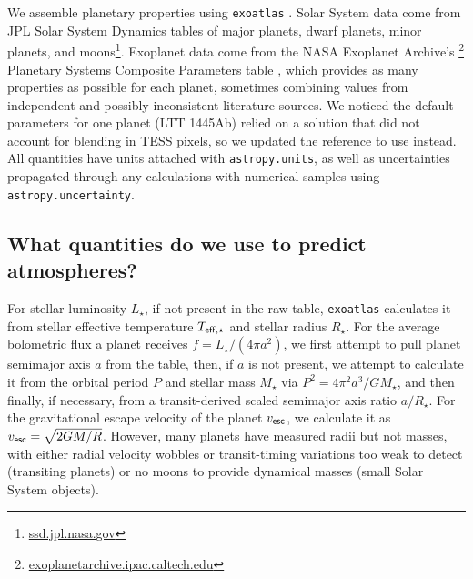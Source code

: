 \documentclass[modern,linenumbers,trackchanges]{aastex7}
\begin{document}
We assemble planetary properties using \texttt{exoatlas} \citep{berta-thompsonZkbtExoatlas2025}. Solar System data come from JPL Solar System Dynamics tables of major planets, dwarf planets, minor planets, and moons\footnote{\href{https://ssd.jpl.nasa.gov}{ssd.jpl.nasa.gov}}. Exoplanet data come from the NASA Exoplanet Archive's \citep{christiansenNASAExoplanetArchive2025}\footnote{\href{https://exoplanetarchive.ipac.caltech.edu}{exoplanetarchive.ipac.caltech.edu}} Planetary Systems Composite Parameters table \citep{nasaexoplanetscienceinstitutePlanetarySystemsComposite2020, nasaexoplanetscienceinstitutePlanetarySystemsTable2020}, which provides as many properties as possible for each planet, sometimes combining values from independent and possibly inconsistent literature sources. We noticed the default parameters for one planet (LTT 1445Ab) relied on a solution that did not account for blending in TESS pixels, so we updated the reference to use  \citet{passHSTWFC3Light2023} instead. All quantities have units attached with \texttt{astropy.units}, as well as uncertainties propagated through any calculations with numerical samples using \texttt{astropy.uncertainty}. %


\subsection{What quantities do we use to predict atmospheres?}

For stellar luminosity $L_\star$, if not present in the raw table, \texttt{exoatlas} calculates it from stellar effective temperature $T_{\sf eff, \star}$ and stellar radius $R_\star$. For the average bolometric flux a planet receives $f = L_\star/(4\pi a^2)$, we first attempt to pull planet semimajor axis $a$ from the table, then, if $a$ is not present, we attempt to calculate it from the orbital period $P$ and stellar mass $M_\star$ via $P^2 = 4\pi^2 a^3/GM_\star$, and then finally, if necessary, from a transit-derived scaled semimajor axis ratio $a/R_\star$. For the gravitational escape velocity of the planet $v_{\sf esc}$, we calculate it as $v_{\sf esc} = \sqrt{2GM / R}$. However, many planets have measured radii but not masses, with either radial velocity wobbles or transit-timing variations too weak to detect (transiting planets) or no moons to provide dynamical masses (small Solar System objects). 
\end{document}
